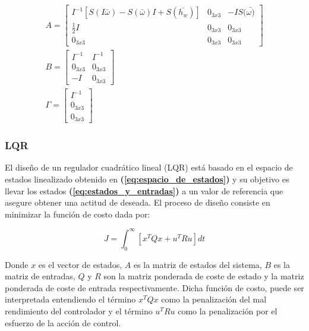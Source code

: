 \begin{gather}
	A = \left[\begin{array}{ccc}
		 I^{-1}\left[S(I\bar{\omega})-S(\bar{\omega})I+S(\bar{h_w})\right]& 0_{3x3} & -IS(\bar{\omega)}\\
		\frac{1}{2}I & 0_{3x3} & 0_{3x3} \\
		 0_{3x3}& 0_{3x3} & 0_{3x3}
	\end{array}\right] \label{eq:matrizA}\\[10pt]
	B= \left[\begin{array}{cc}
		I^{-1}&I^{-1}  \\
		0_{3x3}& 0_{3x3}  \\
		-I& 0_{3x3}
	\end{array}\right]\label{eq:matrizB}\\[10pt]			
	\Gamma =\left[\begin{array}{c}
		I^{-1}  \\
		0_{3x3} \\
		0_{3x3}
	\end{array}\right] \label{eq:matrizGamma}				
\end{gather}
 
	


\subsubsection{LQR}
\hfill \break
El diseño de un regulador cuadrático lineal (LQR) está basado en el espacio de estados linealizado obtenido en \textbf{(\ref{eq:espacio_de_estados})} y su objetivo es llevar los estados \textbf{(\ref{eq:estados_y_entradas})} a un valor de referencia que asegure obtener una actitud de deseada. El proceso de diseño consiste en minimizar la función de costo dada por:

\begin{equation}\label{eq:funcion_de_costo}
	J=\int_{0}^{\infty}\left[x^{T}Qx+u^{T}Ru\right]dt
\end{equation}

Donde $x$ es el vector de estados, $A$ es la matriz de estados del sistema, $B$ es la matriz de entradas, $Q$ y $R$ son la matriz ponderada de coste de estado y la matriz ponderada de coste de entrada respectivamente. Dicha función de costo, puede ser interpretada entendiendo el término $x^{T}Qx$ como la penalización del mal rendimiento del controlador y el término $u^{T}Ru$ como la penalización por el esfuerzo de la acción de control. 

